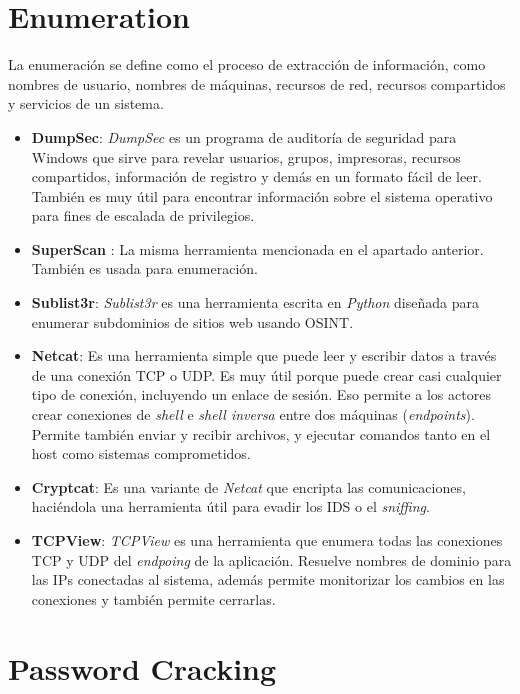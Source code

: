 \documentclass[bibliography=totocnumbered]{scrartcl}
\begin{document}
\newpage
\section{Enumeration}
La enumeración se define como el proceso de extracción de información, como nombres de usuario, nombres de máquinas, recursos de red, recursos compartidos y servicios de un sistema.
\begin{itemize}
    \item \textbf{DumpSec}\parencite{dumpsec}: \textit{DumpSec} es un programa de auditoría de seguridad para Windows que sirve para revelar usuarios, grupos, impresoras, recursos compartidos, información de registro y demás en un formato fácil de leer. También es muy útil para encontrar información sobre el sistema operativo  para fines de escalada de privilegios.
    \item \textbf{SuperScan} \parencite{superscan}: La misma herramienta mencionada en el apartado anterior. También es usada para enumeración.
    \item \textbf{Sublist3r}\parencite{sublist3r}: \textit{Sublist3r} es una herramienta escrita en \textit{Python} diseñada para enumerar subdominios de sitios web usando OSINT\parencite{osint}.
    \item \textbf{Netcat}\parencite{netcat}: Es una herramienta simple que puede leer y escribir datos a través de una conexión TCP o UDP. Es muy útil porque puede crear casi cualquier tipo de conexión, incluyendo un enlace de sesión. Eso permite a los actores crear conexiones de \textit{shell} e \textit{shell inversa} entre dos máquinas (\textit{endpoints}). Permite también enviar y recibir archivos, y ejecutar comandos tanto en el host como sistemas comprometidos.
    \item \textbf{Cryptcat}\parencite{cryptcat}: Es una variante de \textit{Netcat}\parencite{netcat} que encripta las comunicaciones, haciéndola una herramienta útil para evadir los IDS o el \textit{sniffing}.
    \item \textbf{TCPView}\parencite{tcpview}: \textit{TCPView} es una herramienta que enumera todas las conexiones TCP y UDP del \textit{endpoing} de la aplicación. Resuelve nombres de dominio para las IPs conectadas al sistema, además permite monitorizar los cambios en las conexiones y también permite cerrarlas.
\end{itemize}

\newpage
\section{Password Cracking}
\end{document}
